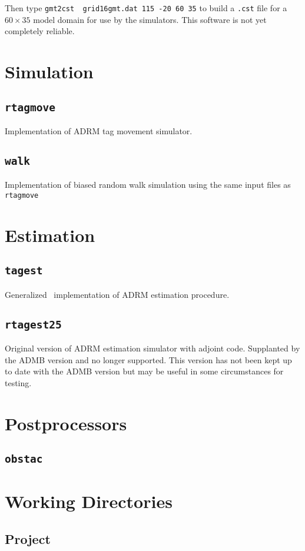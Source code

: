Then type \verb|gmt2cst  grid16gmt.dat 115 -20 60 35| to build a 
{\tt .cst} file for a $60\times35$ model domain for use by the simulators.
This software is not yet completely reliable.


\section*{Simulation}
\subsection*{{\tt rtagmove}}
Implementation of ADRM tag movement simulator.

\subsection*{{\tt walk}}
Implementation of biased random walk simulation using the same input
files as {\tt rtagmove}

\section*{Estimation}
\subsection*{{\tt tagest}}
Generalized \ADMB\ implementation of ADRM estimation procedure.

\subsection*{{\tt rtagest25}}
Original version of ADRM estimation simulator with adjoint code.
Supplanted by the ADMB version and no longer supported. This version
has not been kept up to date with the ADMB version but may be useful
in some circumstances for testing.

\section*{Postprocessors}
\subsection*{{\tt obstac}}

\section*{Working Directories}
\subsection*{Project}
